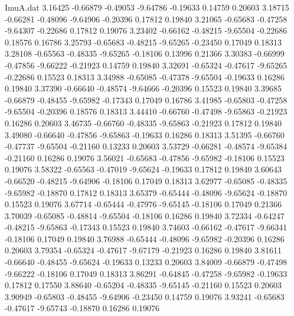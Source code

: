 \begin{filecontents}{ImuA.dat}
   3.16425   -0.66879   -0.49053   -9.64786   -0.19633    0.14759    0.20603
   3.18715   -0.66281   -0.48096   -9.64906   -0.20396    0.17812    0.19840
   3.21065   -0.65683   -0.47258   -9.64307   -0.22686    0.17812    0.19076
   3.23402   -0.66162   -0.48215   -9.65504   -0.22686    0.18576    0.16786
   3.25793   -0.65683   -0.48215   -9.65265   -0.23450    0.17049    0.18313
   3.28108   -0.65563   -0.48335   -9.65265   -0.18106    0.13996    0.21366
   3.30383   -0.66999   -0.47856   -9.66222   -0.21923    0.14759    0.19840
   3.32691   -0.65324   -0.47617   -9.65265   -0.22686    0.15523    0.18313
   3.34988   -0.65085   -0.47378   -9.65504   -0.19633    0.16286    0.19840
   3.37390   -0.66640   -0.48574   -9.64666   -0.20396    0.15523    0.19840
   3.39685   -0.66879   -0.48455   -9.65982   -0.17343    0.17049    0.16786
   3.41985   -0.65803   -0.47258   -9.65504   -0.20396    0.18576    0.18313
   3.44410   -0.66760   -0.47498   -9.65863   -0.21923    0.16286    0.20603
   3.46735   -0.66760   -0.48335   -9.65863   -0.21923    0.17812    0.19840
   3.49080   -0.66640   -0.47856   -9.65863   -0.19633    0.16286    0.18313
   3.51395   -0.66760   -0.47737   -9.65504   -0.21160    0.13233    0.20603
   3.53729   -0.66281   -0.48574   -9.65384   -0.21160    0.16286    0.19076
   3.56021   -0.65683   -0.47856   -9.65982   -0.18106    0.15523    0.19076
   3.58322   -0.65563   -0.47019   -9.65624   -0.19633    0.17812    0.19840
   3.60643   -0.66520   -0.48215   -9.64906   -0.18106    0.17049    0.18313
   3.62977   -0.65085   -0.48335   -9.65982   -0.18870    0.17812    0.18313
   3.65379   -0.65444   -0.48096   -9.65624   -0.18870    0.15523    0.19076
   3.67714   -0.65444   -0.47976   -9.65145   -0.18106    0.17049    0.21366
   3.70039   -0.65085   -0.48814   -9.65504   -0.18106    0.16286    0.19840
   3.72334   -0.64247   -0.48215   -9.65863   -0.17343    0.15523    0.19840
   3.74603   -0.66162   -0.47617   -9.66341   -0.18106    0.17049    0.19840
   3.76988   -0.65444   -0.48096   -9.65982   -0.20396    0.16286    0.20603
   3.79354   -0.65324   -0.47617   -9.67179   -0.21923    0.16286    0.19840
   3.81611   -0.66640   -0.48455   -9.65624   -0.19633    0.13233    0.20603
   3.84009   -0.66879   -0.47498   -9.66222   -0.18106    0.17049    0.18313
   3.86291   -0.64845   -0.47258   -9.65982   -0.19633    0.17812    0.17550
   3.88640   -0.65204   -0.48335   -9.65145   -0.21160    0.15523    0.20603
   3.90949   -0.65803   -0.48455   -9.64906   -0.23450    0.14759    0.19076
   3.93241   -0.65683   -0.47617   -9.65743   -0.18870    0.16286    0.19076

\end{filecontents}
